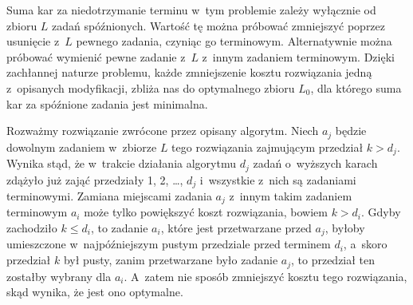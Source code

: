 
\subproblem %
Suma kar za niedotrzymanie terminu w~tym problemie zależy wyłącznie od zbioru $L$ zadań spóźnionych.
Wartość tę można próbować zmniejszyć poprzez usunięcie z~$L$ pewnego zadania, czyniąc go terminowym.
Alternatywnie można próbować wymienić pewne zadanie z~$L$ z~innym zadaniem terminowym.
Dzięki zachłannej naturze problemu, każde zmniejszenie kosztu rozwiązania jedną z~opisanych modyfikacji, zbliża nas do optymalnego zbioru $L_0$, dla którego suma kar za spóźnione zadania jest minimalna.

Rozważmy rozwiązanie zwrócone przez opisany algorytm.
Niech $a_j$ będzie dowolnym zadaniem w~zbiorze $L$ tego rozwiązania zajmującym przedział $k>d_j$.
Wynika stąd, że w~trakcie działania algorytmu $d_j$ zadań o~wyższych karach zdążyło już zająć przedziały 1, 2, \dots, $d_j$ i~wszystkie z~nich są zadaniami terminowymi.
Zamiana miejscami zadania $a_j$ z~innym takim zadaniem terminowym $a_i$ może tylko powiększyć koszt rozwiązania, bowiem $k>d_i$.
Gdyby zachodziło $k\le d_i$, to zadanie $a_i$, które jest przetwarzane przed $a_j$, byłoby umieszczone w~najpóźniejszym pustym przedziale przed terminem $d_i$, a~skoro przedział $k$ był pusty, zanim przetwarzane było zadanie $a_j$, to przedział ten zostałby wybrany dla $a_i$.
A~zatem nie sposób zmniejszyć kosztu tego rozwiązania, skąd wynika, że jest ono optymalne.

\subproblem %
